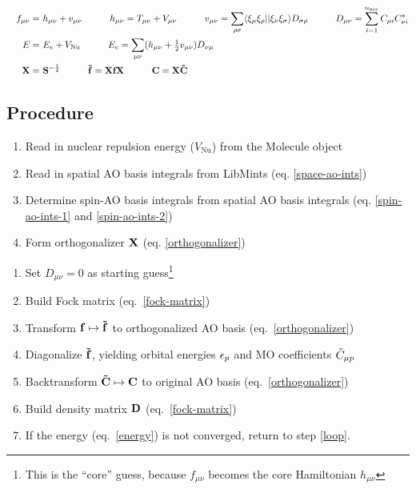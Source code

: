 \documentclass[fleqn]{article}
\begin{document}
\noindent
{}
\begin{align}
\label{fock-matrix}
&&
  f_{\mu\nu}
=&\
  h_{\mu\nu}
+
  v_{\mu\nu}
\hspace{30pt}
  h_{\mu\nu}
=
  T_{\mu\nu}+V_{\mu\nu}
\hspace{30pt}
  v_{\mu\nu}
=
  \sum_{\rho\sigma}
  \langle\xi_\mu\xi_\rho||\xi_\nu\xi_\sigma\rangle
  D_{\sigma\rho}
\hspace{30pt}
  D_{\mu\nu}
=
  \sum_{i=1}^{n_\text{occ}}
  C_{\mu i} C_{\nu i}^*
\\
\label{energy}
&&
  E
=&\
  E_e
+
  V_\mathrm{Nu}
\hspace{30pt}
  E_e
=
  \sum_{\mu\nu}
  (h_{\mu\nu}+\tfrac{1}{2}v_{\mu\nu})D_{\nu\mu}
\\
\label{orthogonalizer}
&&
  \mathbf{X}
=&\
  \mathbf{S}^{-\frac{1}{2}}
\hspace{30pt}
  \mathbf{\tilde{f}}
=
  \mathbf{X}\mathbf{f}\mathbf{X}
\hspace{30pt}
  \mathbf{C}
=
  \mathbf{X}
  \mathbf{\tilde{C}}
\end{align}


\subsection*{Procedure}

\begin{enumerate}
  \item Read in nuclear repulsion energy ($V_\mathrm{Nu}$) from the Molecule object
  \item Read in spatial AO basis integrals from LibMints (eq. \ref{space-ao-ints})
  \item Determine spin-AO basis integrals from spatial AO basis integrals (eq. \ref{spin-ao-ints-1} and \ref{spin-ao-ints-2})
  \item Form orthogonalizer $\mathbf{X}$ (eq. \ref{orthogonalizer})
\end{enumerate}

\noindent
{}
\begin{enumerate}
  \item Set $D_{\mu\nu}=0$ as starting guess\footnote{This is the ``core'' guess, because $f_{\mu\nu}$ becomes the core Hamiltonian $h_{\mu\nu}$}
  \item\label{loop} Build Fock matrix (eq.~\ref{fock-matrix})
  \item Transform $\mathbf{f}\mapsto\mathbf{\tilde{f}}$ to orthogonalized AO basis (eq.~\ref{orthogonalizer})
  \item Diagonalize $\mathbf{\tilde{f}}$, yielding orbital energies $\epsilon_p$ and MO coefficients $\tilde{C}_{\mu p}$
  \item Backtransform $\mathbf{\tilde{C}}\mapsto\mathbf{C}$ to original AO basis (eq.~\ref{orthogonalizer})
  \item Build density matrix $\mathbf{D}$ (eq.~\ref{fock-matrix})
  \item If the energy (eq.~\ref{energy}) is not converged, return to step \ref{loop}.
\end{enumerate}
\end{document}
